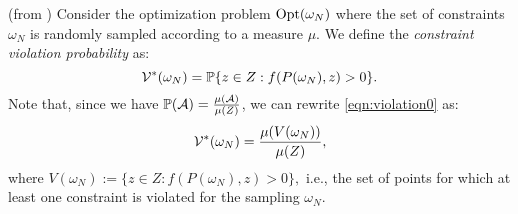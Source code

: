 \begin{definition}(from \cite{campi}) Consider the optimization problem $\text{Opt}(\omega_N)$ where the set of constraints $\omega_N$ is randomly sampled according to a measure $\mu$. We define the \emph{constraint violation probability} as:
\begin{equation}\label{eqn:violation0}
\mathcal{V}^*(\omega_N)=
      \mathbb{P}\{z \in Z: f(P(\omega_N), z) > 0\}.
\end{equation}
Note that, since we have $\mathbb{P}(\mathcal{A}) = \frac{\mu(\mathcal{A})}{\mu(Z)}$, we can rewrite \eqref{eqn:violation0} as:
\begin{equation*}
\mathcal{V}^*(\omega_N)=
      \frac{\mu(V(\omega_N))}{\mu(Z)},
\end{equation*}
where $V(\omega_N):=\{z \in Z: f(P(\omega_N), z) > 0\},$ i.e., the set of points for which at least one constraint is violated for the sampling $\omega_N$.
\end{definition}
%

